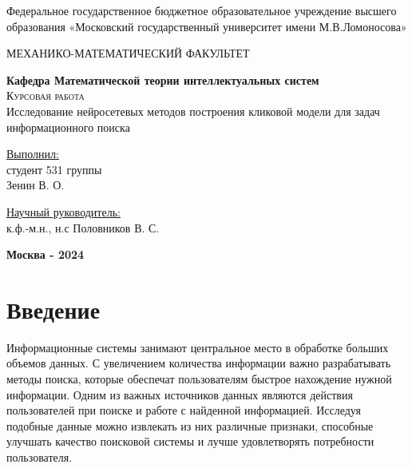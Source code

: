 \documentclass[diploma]{nanolab2015}
\begin{document}
\begin{titlepage}
    \begin{center}
        \large
        Федеральное государственное бюджетное образовательное учреждение
        высшего образования «Московский государственный университет имени
        М.В.Ломоносова»

        МЕХАНИКО-МАТЕМАТИЧЕСКИЙ ФАКУЛЬТЕТ

        \textbf{Кафедра Математической теории интеллектуальных систем}\\
        \vspace{4cm}
        \textsc{\Large Курсовая работа}\\[5mm]
        {\LARGE Исследование нейросетевых методов построения кликовой модели для задач информационного поиска}
    \end{center}
    \vspace{3cm}
    \null

    \begin{flushright}
        \normalsize \underline{Выполнил:}
        \\студент 531 группы
        \\Зенин В. О.
        \\ \underline{\hspace{4cm}}
    \end{flushright}
    \vspace{1cm}

    \begin{flushright}
        \normalsize \underline{Научный руководитель:}
        \\к.ф.-м.н., н.с Половников В. С.
        \\ \underline{\hspace{4cm}}
    \end{flushright}

    \vfill
    \begin{center}
        \textbf{Москва - 2024}
    \end{center}
\end{titlepage}
\setcounter{page}{3}
\clearpage
\tableofcontents{}  %
\clearpage
\chapter{Введение}
Информационные системы занимают центральное место в обработке больших объемов данных. С увеличением количества информации важно разрабатывать методы поиска, которые обеспечат пользователям быстрое нахождение нужной информации. Одним из важных источников данных являются действия пользователей при поиске и работе с найденной информацией. Исследуя подобные данные можно извлекать из них различные признаки, способные улучшать качество поисковой системы и лучше удовлетворять потребности пользователя.
\end{document}
